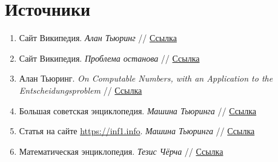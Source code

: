 \documentclass{article}
\begin{document}
\section*{Источники}
\begin{enumerate}
    \item \label{itm:bio} Сайт Википедия. \textit{Алан Тьюринг} // \href{https://ru.wikipedia.org/wiki/%D0%A2%D1%8C%D1%8E%D1%80%D0%B8%D0%BD%D0%B3,_%D0%90%D0%BB%D0%B0%D0%BD}{Ссылка}
    \item \label{itm:problem-def} Сайт Википедия. \textit{Проблема останова} // \href{https://ru.wikipedia.org/wiki/%D0%9F%D1%80%D0%BE%D0%B1%D0%BB%D0%B5%D0%BC%D0%B0_%D0%BE%D1%81%D1%82%D0%B0%D0%BD%D0%BE%D0%B2%D0%BA%D0%B8}{Ссылка}
    \item \label{itm:problem-sol} Алан Тьюринг. \textit{On Computable Numbers, with an Application to the Entscheidungsproblem} // \href{https://www.cs.virginia.edu/~robins/Turing_Paper_1936.pdf}{Ссылка}
    \item \label{itm:machine-def} Большая советская энциклопедия. \textit{Машина Тьюринга} // \href{https://dic.academic.ru/dic.nsf/bse/141979/Тьюринга}{Ссылка}
    \item \label{itm:machine-work} Статья на сайте \url{https://inf1.info}. \textit{Машина Тьюринга} // \href{https://inf1.info/turing}{Ссылка}
    \item \label{itm:church-def} Математическая энциклопедия. \textit{Тезис Чёрча} // \href{https://dic.academic.ru/dic.nsf/enc_mathematics/6170/%D0%A7%D0%81%D0%A0%D0%A7%D0%90}{Ссылка}
\end{enumerate}
\end{document}
